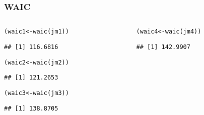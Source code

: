 \documentclass[color=usenames,dvipsnames]{beamer}\usepackage[]{graphicx}\usepackage[]{color}
\makeatletter
\newcommand{\hlstd}[1]{\textcolor[rgb]{0,0,0}{#1}}%
\newcommand{\hlkwb}[1]{\textcolor[rgb]{0,0.341,0.682}{#1}}%
\newcommand{\hlkwd}[1]{\textcolor[rgb]{0.004,0.004,0.506}{#1}}%
\newenvironment{kframe}{%
 \def\at@end@of@kframe{}%
 \ifinner\ifhmode%
  \def\at@end@of@kframe{\end{minipage}}%
  \begin{minipage}{\columnwidth}%
 \fi\fi%
 \def\FrameCommand##1{\hskip\@totalleftmargin \hskip-\fboxsep
 \colorbox{shadecolor}{##1}\hskip-\fboxsep
     \hskip-\linewidth \hskip-\@totalleftmargin \hskip\columnwidth}%
 \MakeFramed {\advance\hsize-\width
   \@totalleftmargin\z@ \linewidth\hsize
   \@setminipage}}%
 {\par\unskip\endMakeFramed%
 \at@end@of@kframe}
\newenvironment{knitrout}{}{} %
\makeatother
\begin{document}
\begin{frame}[fragile]
  \frametitle{WAIC}
  \begin{columns}
    \begin{column}{0.5\textwidth}
\begin{knitrout}\scriptsize
{}\color{fgcolor}\begin{kframe}
\begin{alltt}
\hlstd{(waic1} \hlkwb{<-} \hlkwd{waic}\hlstd{(jm1))}
\end{alltt}
\begin{verbatim}
## [1] 116.6816
\end{verbatim}
\end{kframe}
\end{knitrout}
\begin{knitrout}\scriptsize
{}\color{fgcolor}\begin{kframe}
\begin{alltt}
\hlstd{(waic2} \hlkwb{<-} \hlkwd{waic}\hlstd{(jm2))}
\end{alltt}
\begin{verbatim}
## [1] 121.2653
\end{verbatim}
\end{kframe}
\end{knitrout}
\begin{knitrout}\scriptsize
{}\color{fgcolor}\begin{kframe}
\begin{alltt}
\hlstd{(waic3} \hlkwb{<-} \hlkwd{waic}\hlstd{(jm3))}
\end{alltt}
\begin{verbatim}
## [1] 138.8705
\end{verbatim}
\end{kframe}
\end{knitrout}
    \end{column}
    \begin{column}{0.5\textwidth}
\begin{knitrout}\scriptsize
{}\color{fgcolor}\begin{kframe}
\begin{alltt}
\hlstd{(waic4} \hlkwb{<-} \hlkwd{waic}\hlstd{(jm4))}
\end{alltt}
\begin{verbatim}
## [1] 142.9907
\end{verbatim}
\end{kframe}

\end{knitrout}
\end{column}
\end{columns}
\end{frame}
\end{document}

